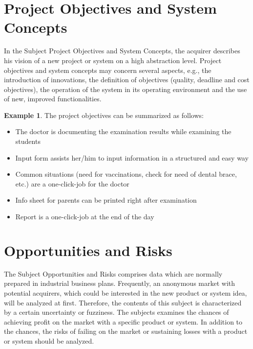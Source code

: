 \documentclass[12pt]{article}
\theoremstyle{definition}
\newtheorem{example}{Example}
\newenvironment{explanation}{%
   \setlength{\parindent}{0pt}
   \itshape
   \color{blue}
}{}
\begin{document}
\pagebreak

\section{Project Objectives and System Concepts}
\begin{explanation}
In the Subject Project Objectives and System Concepts, the acquirer describes his vision of a new project or system on a high abstraction level. Project objectives and system concepts may concern several aspects, e.g., the introduction of innovations, the definition of objectives (quality, deadline and cost objectives), the operation of the system in its operating environment and the use of new, improved functionalities.
\end{explanation}

\begin{example}
The project objectives can be summarized as follows:
\begin{itemize}
\item The doctor is documenting the examination results while examining the students
\item Input form assists her/him to input information in a structured and easy way
\item Common situations (need for vaccinations, check for need of dental brace, etc.) are a one-click-job for the doctor
\item Info sheet for parents can be printed right after examination
\item Report is a one-click-job at the end of the day
\end{itemize}
\end{example}

\pagebreak
\section{Opportunities and Risks}
\begin{explanation}
The Subject Opportunities and Risks comprises data which are normally prepared in industrial business plans. Frequently, an anonymous market with potential acquirers, which could be interested in the new product or system idea, will be analyzed at first. Therefore, the contents of this subject is characterized by a certain uncertainty or fuzziness. The subjects examines the chances of achieving profit on the market with a specific product or system. In addition to the chances, the risks of failing on the market or sustaining losses with a product or system should be analyzed.
\end{explanation}
\end{document}

